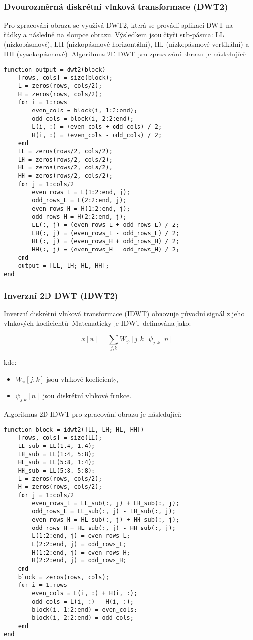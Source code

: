 \subsubsection{Dvourozměrná diskrétní vlnková transformace (DWT2)}
Pro zpracování obrazu se využívá DWT2, která se provádí aplikací DWT na řádky a následně na sloupce obrazu. Výsledkem jsou čtyři sub-pásma: LL (nízkopásmové), LH (nízkopásmové horizontální), HL (nízkopásmové vertikální) a HH (vysokopásmové). Algoritmus 2D DWT pro zpracování obrazu je následující:
\begin{verbatim}
function output = dwt2(block)
    [rows, cols] = size(block);
    L = zeros(rows, cols/2);
    H = zeros(rows, cols/2);
    for i = 1:rows
        even_cols = block(i, 1:2:end);
        odd_cols = block(i, 2:2:end);
        L(i, :) = (even_cols + odd_cols) / 2;
        H(i, :) = (even_cols - odd_cols) / 2;
    end
    LL = zeros(rows/2, cols/2);
    LH = zeros(rows/2, cols/2);
    HL = zeros(rows/2, cols/2);
    HH = zeros(rows/2, cols/2);
    for j = 1:cols/2
        even_rows_L = L(1:2:end, j);
        odd_rows_L = L(2:2:end, j);
        even_rows_H = H(1:2:end, j);
        odd_rows_H = H(2:2:end, j);
        LL(:, j) = (even_rows_L + odd_rows_L) / 2;
        LH(:, j) = (even_rows_L - odd_rows_L) / 2;
        HL(:, j) = (even_rows_H + odd_rows_H) / 2;
        HH(:, j) = (even_rows_H - odd_rows_H) / 2;
    end
    output = [LL, LH; HL, HH];
end
\end{verbatim}

\subsubsection{Inverzní 2D DWT (IDWT2)}
Inverzní diskrétní vlnková transformace (IDWT) obnovuje původní signál z jeho vlnkových koeficientů. Matematicky je IDWT definována jako:

\[
x[n] = \sum_{j,k} W_{\psi}[j, k] \psi_{j,k}[n]
\]

kde:
\begin{itemize}
    \item \(W_{\psi}[j, k]\) jsou vlnkové koeficienty,
    \item \(\psi_{j,k}[n]\) jsou diskrétní vlnkové funkce.
\end{itemize}
Algoritmus 2D IDWT pro zpracování obrazu je následující:
\begin{verbatim}
function block = idwt2([LL, LH; HL, HH])
    [rows, cols] = size(LL);
    LL_sub = LL(1:4, 1:4);
    LH_sub = LL(1:4, 5:8);
    HL_sub = LL(5:8, 1:4);
    HH_sub = LL(5:8, 5:8);
    L = zeros(rows, cols/2);
    H = zeros(rows, cols/2);
    for j = 1:cols/2
        even_rows_L = LL_sub(:, j) + LH_sub(:, j);
        odd_rows_L = LL_sub(:, j) - LH_sub(:, j);
        even_rows_H = HL_sub(:, j) + HH_sub(:, j);
        odd_rows_H = HL_sub(:, j) - HH_sub(:, j);
        L(1:2:end, j) = even_rows_L;
        L(2:2:end, j) = odd_rows_L;
        H(1:2:end, j) = even_rows_H;
        H(2:2:end, j) = odd_rows_H;
    end
    block = zeros(rows, cols);
    for i = 1:rows
        even_cols = L(i, :) + H(i, :);
        odd_cols = L(i, :) - H(i, :);
        block(i, 1:2:end) = even_cols;
        block(i, 2:2:end) = odd_cols;
    end
end
\end{verbatim}